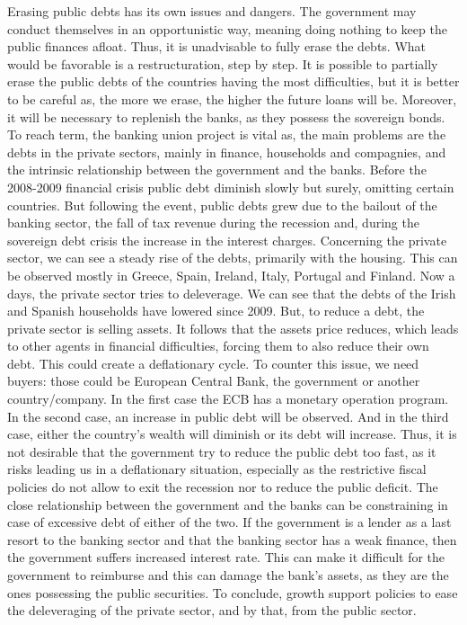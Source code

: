 \documentclass[12pt]{article}
\begin{document}
Erasing public debts has its own issues and dangers. The government may conduct themselves in an opportunistic way, meaning doing nothing to keep the public finances afloat. Thus, it is unadvisable to fully erase the debts. What would be favorable is a restructuration, step by step. It is possible to partially erase the public debts of the countries having the most difficulties, but it is better to be careful as, the more we erase, the higher the future loans will be. Moreover, it will be necessary to replenish the banks, as they possess the sovereign bonds. To reach term, the banking union project is vital as, the main problems are the debts in the private sectors, mainly in finance, households and compagnies, and the intrinsic relationship between the government and the banks.
Before the 2008-2009 financial crisis public debt diminish slowly but surely, omitting certain countries. But following the event, public debts grew due to the bailout of the banking sector, the fall of tax revenue during the recession and, during the sovereign debt crisis the increase in the interest charges. Concerning the private sector, we can see a steady rise of the debts, primarily with the housing. This can be observed mostly in Greece, Spain, Ireland, Italy, Portugal and Finland.
Now a days, the private sector tries to deleverage. We can see that the debts of the Irish and Spanish households have lowered since 2009. But, to reduce a debt, the private sector is selling assets. It follows that the assets price reduces, which leads to other agents in financial difficulties, forcing them to also reduce their own debt. This could create a deflationary cycle. To counter this issue, we need buyers: those could be European Central Bank, the government or another country/company. In the first case the ECB has a monetary operation program. In the second case, an increase in public debt will be observed. And in the third case, either the country’s wealth will diminish or its debt will increase. Thus, it is not desirable that the government try to reduce the public debt too fast, as it risks leading us in a deflationary situation, especially as the restrictive fiscal policies do not allow to exit the recession nor to reduce the public deficit.
The close relationship between the government and the banks can be constraining in case of excessive debt of either of the two. If the government is a lender as a last resort to the banking sector and that the banking sector has a weak finance, then the government suffers increased interest rate. This can make it difficult for the government to reimburse and this can damage the bank’s assets, as they are the ones possessing the public securities. To conclude, growth support policies to ease the deleveraging of the private sector, and by that, from the public sector.
\end{document}
